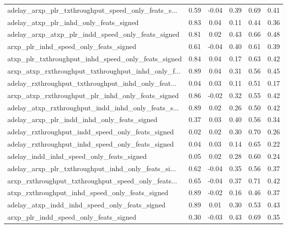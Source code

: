 \begin{tabular}{|l|*{4}{c}|r|}
adelay\_arxp\_plr\_txthroughput\_speed\_only\_feats\_s... & 0.59 & -0.04 &    0.39 &       0.69 &  0.41 \\
adelay\_atxp\_plr\_inhd\_only\_feats\_signed             & 0.83 &  0.04 &    0.11 &       0.44 &  0.36 \\
adelay\_arxp\_atxp\_plr\_indd\_speed\_only\_feats\_signed  & 0.81 &  0.02 &    0.43 &       0.66 &  0.48 \\
arxp\_plr\_inhd\_speed\_only\_feats\_signed              & 0.61 & -0.04 &    0.40 &       0.61 &  0.39 \\
atxp\_plr\_txthroughput\_inhd\_speed\_only\_feats\_signed & 0.84 &  0.04 &    0.17 &       0.63 &  0.42 \\
arxp\_atxp\_rxthroughput\_txthroughput\_inhd\_only\_f... & 0.89 &  0.04 &    0.31 &       0.56 &  0.45 \\
adelay\_rxthroughput\_txthroughput\_inhd\_only\_feat... & 0.04 &  0.03 &    0.11 &       0.51 &  0.17 \\
arxp\_atxp\_rxthroughput\_plr\_inhd\_only\_feats\_signed  & 0.86 & -0.02 &    0.32 &       0.55 &  0.42 \\
adelay\_atxp\_rxthroughput\_indd\_inhd\_only\_feats\_s... & 0.89 &  0.02 &    0.26 &       0.50 &  0.42 \\
adelay\_arxp\_plr\_indd\_inhd\_only\_feats\_signed        & 0.37 &  0.03 &    0.40 &       0.56 &  0.34 \\
adelay\_rxthroughput\_indd\_speed\_only\_feats\_signed   & 0.02 &  0.02 &    0.30 &       0.70 &  0.26 \\
adelay\_rxthroughput\_inhd\_speed\_only\_feats\_signed   & 0.04 &  0.03 &    0.14 &       0.65 &  0.22 \\
adelay\_indd\_inhd\_speed\_only\_feats\_signed           & 0.05 &  0.02 &    0.28 &       0.60 &  0.24 \\
adelay\_arxp\_plr\_txthroughput\_inhd\_only\_feats\_si... & 0.62 & -0.04 &    0.35 &       0.56 &  0.37 \\
arxp\_rxthroughput\_txthroughput\_speed\_only\_feats... & 0.65 & -0.04 &    0.37 &       0.71 &  0.42 \\
atxp\_rxthroughput\_inhd\_speed\_only\_feats\_signed     & 0.89 & -0.02 &    0.16 &       0.46 &  0.37 \\
adelay\_atxp\_indd\_inhd\_speed\_only\_feats\_signed      & 0.89 &  0.01 &    0.30 &       0.53 &  0.43 \\
arxp\_plr\_indd\_speed\_only\_feats\_signed              & 0.30 & -0.03 &    0.43 &       0.69 &  0.35 \\

\end{tabular}
